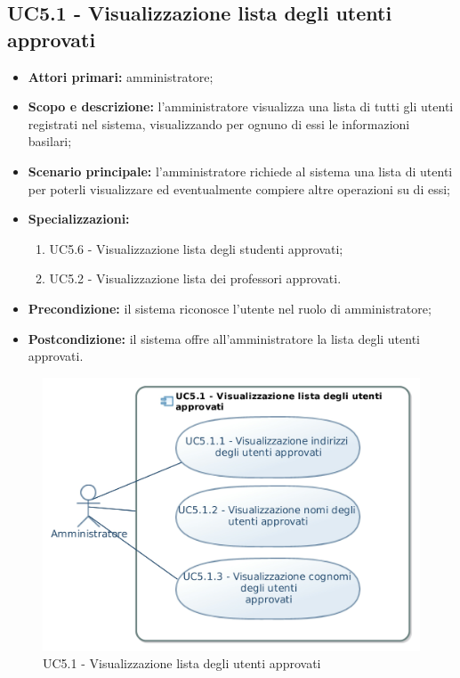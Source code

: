 \documentclass[AnalisiDeiRequisiti.tex]{subfiles}
\begin{document}
\subsection{UC5.1 - Visualizzazione lista degli utenti approvati}
\begin{itemize}
	\item \textbf{Attori primari:} amministratore;
	\item \textbf{Scopo e descrizione:} l'amministratore visualizza una lista di tutti gli utenti registrati nel sistema, visualizzando per ognuno di essi le informazioni basilari;
	\item \textbf{Scenario principale:} l'amministratore richiede al sistema una lista di utenti per poterli visualizzare ed eventualmente compiere altre operazioni su di essi;
	\item \textbf{Specializzazioni:}
	\begin{enumerate}
		\item UC5.6 - Visualizzazione lista degli studenti approvati;
		\item UC5.2 - Visualizzazione lista dei professori approvati.
	\end{enumerate}
	\item \textbf{Precondizione:} il sistema riconosce l'utente nel ruolo di amministratore; 
	\item \textbf{Postcondizione:} il sistema offre all'amministratore la lista degli utenti approvati.
\end{itemize}
\begin{figure}[H]
	\centering
	\includegraphics[width=0.9\linewidth]{UC5_1.jpg}
	\caption{UC5.1 - Visualizzazione lista degli utenti approvati}
	\label{fig:UC5.1 - Visualizzazione lista degli utenti approvati}
\end{figure}
\end{document}
